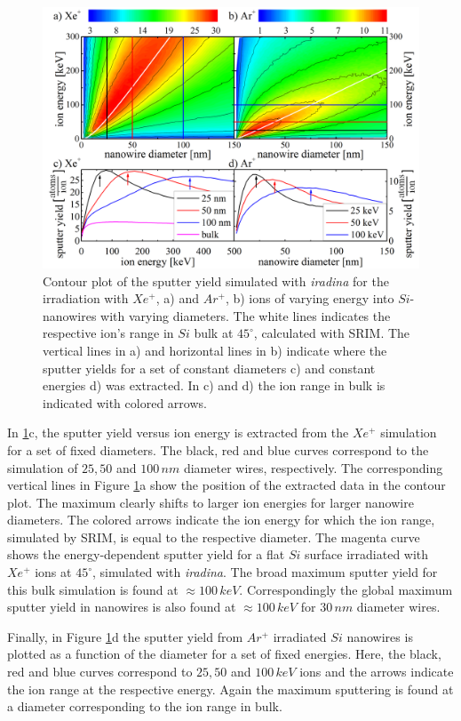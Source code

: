\begin{figure}[th]
	\centering
		\includegraphics[width=.9\textwidth]{images/sputtering_diameter_energy.png}
	\caption{Contour plot of the sputter yield simulated with \emph{iradina} for the irradiation with $Xe^+$, a) and $Ar^+$, b) ions of varying energy into $Si$-nanowires with varying diameters. The white lines indicates the respective ion's range in $Si$ bulk at $45^\circ$, calculated with SRIM. The vertical lines in a) and horizontal lines in b) indicate where the sputter yields for a set of constant diameters c) and constant energies d) was extracted. In c) and d) the ion range in bulk is indicated with colored arrows.} 
	\label{sputtering_de}
\end{figure} 

In \ref{sputtering_de}c, the sputter yield versus ion energy is extracted from the $Xe^+$ simulation for a set of fixed diameters. The black, red and blue curves correspond to the simulation of $25, 50$ and $100\,nm$ diameter wires, respectively. The corresponding vertical lines in Figure \ref{sputtering_de}a show the position of the extracted data in the contour plot. The maximum clearly shifts to larger ion energies for larger nanowire diameters. The colored arrows indicate the ion energy for which the ion range, simulated by SRIM, is equal to the respective diameter. The magenta curve shows the energy-dependent sputter yield for a flat $Si$ surface irradiated with $Xe^+$ ions at $45^\circ$, simulated with \emph{iradina}. The broad maximum sputter yield for this bulk simulation is found at $\approx 100 \,keV$. Correspondingly the global maximum sputter yield in nanowires is also found at $\approx 100 \,keV$ for $30\,nm$ diameter wires.

Finally, in Figure \ref{sputtering_de}d the sputter yield from $Ar^+$ irradiated $Si$ nanowires is plotted as a function of the diameter for a set of fixed energies. Here, the black, red and blue curves correspond to $25, 50$ and $100\,keV$ ions and the arrows indicate the ion range at the respective energy. Again the maximum sputtering is found at a diameter corresponding to the ion range in bulk.

